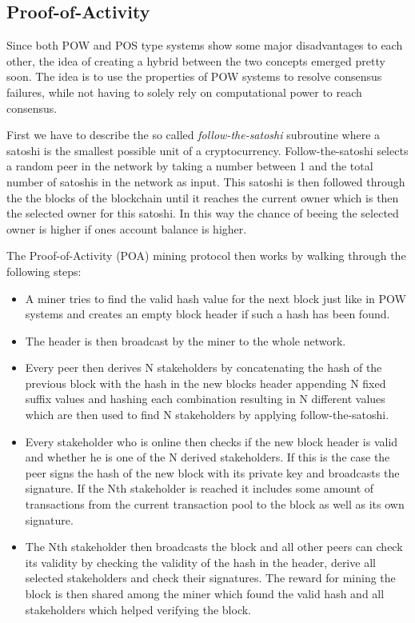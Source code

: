 \subsection{Proof-of-Activity} \label{poa}

Since both POW and POS type systems show some major disadvantages to each other, the idea of creating a hybrid between the two concepts emerged pretty soon. The idea is to use the properties of POW
systems to resolve consensus failures, while not having to solely rely on computational power to reach consensus.\par First we have to describe the so called \textit{follow-the-satoshi} subroutine
where a satoshi is the smallest possible unit of a cryptocurrency. Follow-the-satoshi selects a random peer in the network by taking a number between 1 and the total number of satoshis in the network
as input. This satoshi is then followed through the the blocks of the blockchain until it reaches the current owner which is then the selected owner for this satoshi. In this way the chance of beeing
the selected owner is higher if ones account balance is higher.\par The Proof-of-Activity (POA) mining protocol then works by walking through the following steps: 
\begin{itemize} 
\item A miner tries to find the valid hash value for the next block just like in POW systems and creates an empty block header if such a hash has been found. 
\item The header is then broadcast by the miner to the whole
network. 
\item Every peer then derives N stakeholders by concatenating the hash of the previous block with the hash in the new blocks header appending N fixed suffix values and hashing each
combination resulting in N different values which are then used to find N stakeholders by applying follow-the-satoshi. 
\item Every stakeholder who is online then checks if the new block header is
valid and whether he is one of the N derived stakeholders. If this is the case the peer signs the hash of the new block with its private key and broadcasts the signature. If the Nth stakeholder is
reached it includes some amount of transactions from the current transaction pool to the block as well as its own signature. 
\item The Nth stakeholder then broadcasts the block and all other peers can
check its validity by checking the validity of the hash in the header, derive all selected stakeholders and check their signatures. The reward for mining the block is then shared among the miner which
found the valid hash and all stakeholders which helped verifying the block. 
\end{itemize}

